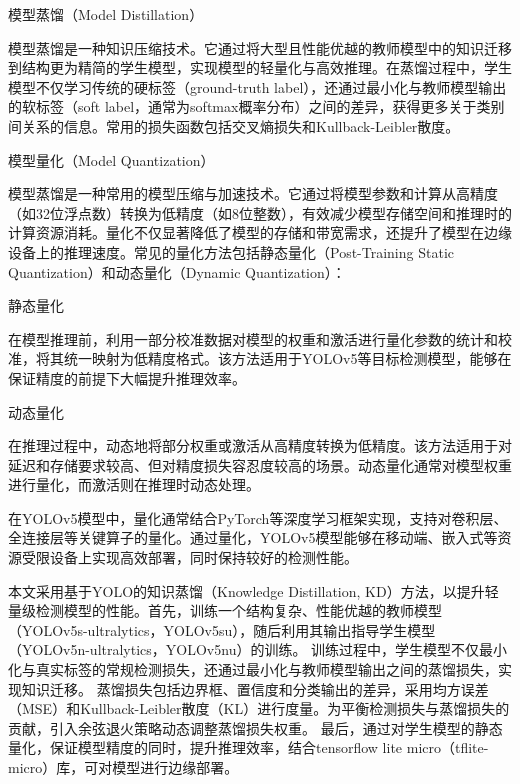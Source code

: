 \documentclass[a4paper, UTF8, fontsize=12pt]{ctexart} %
\numberwithin{equation}{section} %
\begin{document}
\begin{parlist}


\item 模型蒸馏（Model Distillation）

模型蒸馏是一种知识压缩技术。它通过将大型且性能优越的教师模型中的知识迁移到结构更为精简的学生模型，实现模型的轻量化与高效推理。在蒸馏过程中，学生模型不仅学习传统的硬标签（ground-truth label），还通过最小化与教师模型输出的软标签（soft label，通常为softmax概率分布）之间的差异，获得更多关于类别间关系的信息。常用的损失函数包括交叉熵损失和Kullback-Leibler散度。

\item 模型量化（Model Quantization）

模型蒸馏是一种常用的模型压缩与加速技术。它通过将模型参数和计算从高精度（如32位浮点数）转换为低精度（如8位整数），有效减少模型存储空间和推理时的计算资源消耗。量化不仅显著降低了模型的存储和带宽需求，还提升了模型在边缘设备上的推理速度。常见的量化方法包括静态量化（Post-Training Static Quantization）和动态量化（Dynamic Quantization）：

\begin{halfparlist}
    \item 静态量化

    在模型推理前，利用一部分校准数据对模型的权重和激活进行量化参数的统计和校准，将其统一映射为低精度格式。该方法适用于YOLOv5等目标检测模型，能够在保证精度的前提下大幅提升推理效率。

    \item 动态量化

    在推理过程中，动态地将部分权重或激活从高精度转换为低精度。该方法适用于对延迟和存储要求较高、但对精度损失容忍度较高的场景。动态量化通常对模型权重进行量化，而激活则在推理时动态处理。

    \end{halfparlist}

\end{parlist}

在YOLOv5模型中，量化通常结合PyTorch等深度学习框架实现，支持对卷积层、全连接层等关键算子的量化。通过量化，YOLOv5模型能够在移动端、嵌入式等资源受限设备上实现高效部署，同时保持较好的检测性能。

本文采用基于YOLO的知识蒸馏（Knowledge Distillation, KD）方法，以提升轻量级检测模型的性能。首先，训练一个结构复杂、性能优越的教师模型（YOLOv5s-ultralytics，YOLOv5su），随后利用其输出指导学生模型（YOLOv5n-ultralytics，YOLOv5nu）的训练。
训练过程中，学生模型不仅最小化与真实标签的常规检测损失，还通过最小化与教师模型输出之间的蒸馏损失，实现知识迁移。
蒸馏损失包括边界框、置信度和分类输出的差异，采用均方误差（MSE）和Kullback-Leibler散度（KL）进行度量。为平衡检测损失与蒸馏损失的贡献，引入余弦退火策略动态调整蒸馏损失权重。
最后，通过对学生模型的静态量化，保证模型精度的同时，提升推理效率，结合tensorflow lite micro（tflite-micro）库，可对模型进行边缘部署。
\end{document}
